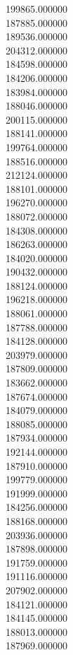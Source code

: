 199865.000000\\
187885.000000\\
189536.000000\\
204312.000000\\
184598.000000\\
184206.000000\\
183984.000000\\
188046.000000\\
200115.000000\\
188141.000000\\
199764.000000\\
188516.000000\\
212124.000000\\
188101.000000\\
196270.000000\\
188072.000000\\
184308.000000\\
186263.000000\\
184020.000000\\
190432.000000\\
188124.000000\\
196218.000000\\
188061.000000\\
187788.000000\\
184128.000000\\
203979.000000\\
187809.000000\\
183662.000000\\
187674.000000\\
184079.000000\\
188085.000000\\
187934.000000\\
192144.000000\\
187910.000000\\
199779.000000\\
191999.000000\\
184256.000000\\
188168.000000\\
203936.000000\\
187898.000000\\
191759.000000\\
191116.000000\\
207902.000000\\
184121.000000\\
184145.000000\\
188013.000000\\
187969.000000\\
